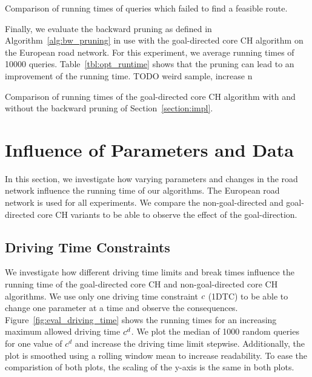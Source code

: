 \begin{table}[hbtp]
	\centering
	
	\caption{Comparison of running times of queries which failed to find a feasible route.}
	\label{tbl:times_no_path}
\end{table}

Finally, we evaluate the backward pruning as defined in Algorithm~\ref{alg:bw_pruning} in use with the goal-directed core CH algorithm on the European road network. For this experiment, we average running times of \num{10000} queries. Table~\ref{tbl:opt_runtime} shows that the pruning can lead to an improvement of the running time. TODO weird sample, increase n

\begin{table}[hbtp]
	\centering
	
	\caption{Comparison of running times of the goal-directed core CH algorithm with and without the backward pruning of Section~\ref{section:impl}.}
	\label{tbl:opt_runtime}
\end{table}

\section{Influence of Parameters and Data}
In this section, we investigate how varying parameters and changes in the road network influence the running time of our algorithms. The European road network is used for all experiments. We compare the non-goal-directed and goal-directed core CH variants to be able to observe the effect of the goal-direction.

\subsection{Driving Time Constraints}
We investigate how different driving time limits and break times influence the running time of the goal-directed core CH and non-goal-directed core CH algorithms. We use only one driving time constraint $c$ (1DTC) to be able to change one parameter at a time and observe the consequences. Figure~\ref{fig:eval_driving_time} shows the running times for an increasing maximum allowed driving time $c^d$. We plot the median of 1000 random queries for one value of $c^d$ and increase the driving time limit stepwise. Additionally, the plot is smoothed using a rolling window mean to increase readability. To ease the comparistion of both plots, the scaling of the y-axis is the same in both plots.

